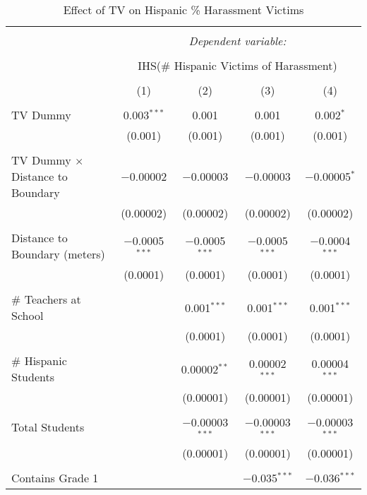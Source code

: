 
\begin{table}[!htbp] \centering 
  \caption{Effect of TV on Hispanic \% Harassment Victims} 
  \label{} 
\begin{tabular}{@{\extracolsep{-2pt}}lcccc} 
\\[-1.8ex]\hline 
\hline \\[-1.8ex] 
 & \multicolumn{4}{c}{\textit{Dependent variable:}} \\ 
\cline{2-5} 
\\[-1.8ex] & \multicolumn{4}{c}{IHS(\# Hispanic Victims of Harassment)} \\ 
\\[-1.8ex] & (1) & (2) & (3) & (4)\\ 
\hline \\[-1.8ex] 
 TV Dummy & 0.003$^{***}$ & 0.001 & 0.001 & 0.002$^{*}$ \\ 
  & (0.001) & (0.001) & (0.001) & (0.001) \\ 
  & & & & \\ 
 TV Dummy $\times$ Distance to Boundary & $-$0.00002 & $-$0.00003 & $-$0.00003 & $-$0.00005$^{*}$ \\ 
  & (0.00002) & (0.00002) & (0.00002) & (0.00002) \\ 
  & & & & \\ 
 Distance to Boundary (meters) & $-$0.0005$^{***}$ & $-$0.0005$^{***}$ & $-$0.0005$^{***}$ & $-$0.0004$^{***}$ \\ 
  & (0.0001) & (0.0001) & (0.0001) & (0.0001) \\ 
  & & & & \\ 
 \# Teachers at School &  & 0.001$^{***}$ & 0.001$^{***}$ & 0.001$^{***}$ \\ 
  &  & (0.0001) & (0.0001) & (0.0001) \\ 
  & & & & \\ 
 \# Hispanic Students &  & 0.00002$^{**}$ & 0.00002$^{***}$ & 0.00004$^{***}$ \\ 
  &  & (0.00001) & (0.00001) & (0.00001) \\ 
  & & & & \\ 
 Total Students &  & $-$0.00003$^{***}$ & $-$0.00003$^{***}$ & $-$0.00003$^{***}$ \\ 
  &  & (0.00001) & (0.00001) & (0.00001) \\ 
  & & & & \\ 
 Contains Grade 1 &  &  & $-$0.035$^{***}$ & $-$0.036$^{***}$ \\ 

\end{tabular}
\end{table}
